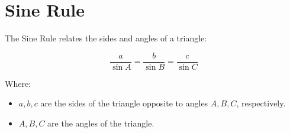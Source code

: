 \documentclass{article}
\begin{document}
\section*{Sine Rule}

The Sine Rule relates the sides and angles of a triangle:

\[
\frac{a}{\sin A} = \frac{b}{\sin B} = \frac{c}{\sin C}
\]

Where:
\begin{itemize}
    \item \(a, b, c\) are the sides of the triangle opposite to angles \(A, B, C\), respectively.
    \item \(A, B, C\) are the angles of the triangle.
\end{itemize}
\end{document}
